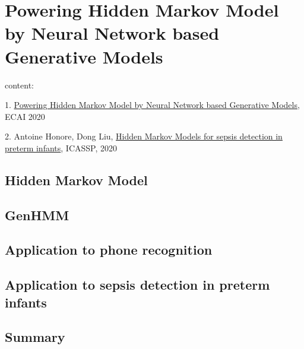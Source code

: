 \chapter{Powering Hidden Markov Model by Neural Network based Generative Models}
content:

1. \href{https://arxiv.org/abs/1910.05744}{Powering Hidden Markov Model by Neural Network based Generative Models}, ECAI 2020

2. Antoine Honore, Dong Liu, \href{https://arxiv.org/pdf/1910.13904.pdf}{Hidden Markov Models for sepsis detection in preterm infants}, ICASSP, 2020

\section{Hidden Markov Model}

\section{GenHMM}

\section{Application to phone recognition}

\section{Application to sepsis detection in preterm infants}

\section{Summary}

